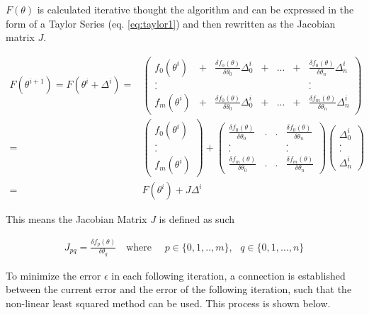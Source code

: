 $F(\theta)$ is calculated iterative thought the algorithm and can be expressed in the form of a Taylor Series (eq. \ref*{eq:taylor1}) and
then rewritten as the Jacobian matrix $J$.

\begin{align}
	F(\theta^{i+1}) = F(\theta^{i} + \Delta^{i}) =&
		\begin{pmatrix} f_0(\theta^{i}) &+& \frac{\delta f_0(\theta)}{\delta \theta_0} \Delta^{i}_0 &+& ... &+&  \frac{\delta f_0(\theta)}{\delta \theta_n} \Delta^{i}_n  \\
				. && && && . \\
				. && && && . \\
				f_m(\theta^{i}) &+& \frac{\delta f_0(\theta)}{\delta \theta_0} \Delta^{i}_0 &+& ... &+&  \frac{\delta f_m(\theta)}{\delta \theta_n} \Delta^{i}_n 
		\end{pmatrix} \label{eq:taylor1} \\
	=& \begin{pmatrix} f_0(\theta^{i}) \\ . \\ . \\ f_m(\theta^{i})  \end{pmatrix} +
		\begin{pmatrix} \frac{\delta f_0(\theta)}{\delta \theta_0} & . & . & \frac{\delta f_0(\theta)}{\delta \theta_n}  \\
					   . &&& . \\
					   . &&& . \\
					   \frac{\delta f_m(\theta)}{\delta \theta_0} & . & . & \frac{\delta f_m(\theta)}{\delta \theta_n}
		\end{pmatrix} \begin{pmatrix} \Delta^{i}_0 \\ . \\ . \\ \Delta^{i}_n \end{pmatrix}  \label{eq:taylor2} \\
	=& F(\theta^{i}) + J \Delta^{i} \label{eq:taylor3}
\end{align}

This means the Jacobian Matrix $J$ is defined as such

\begin{align}
	J_{pq} = \frac{\delta f_p(\theta)}{\delta \theta_q} \quad \text{where } \quad p \in \{0,1,..,m\},\text{ } q \in \{0,1,...,n\}
\end{align}

To minimize the error $\epsilon$ in each following iteration, a connection is established between the current error and the
error of the following iteration, such that the non-linear least squared method can be used. This process is shown below.

